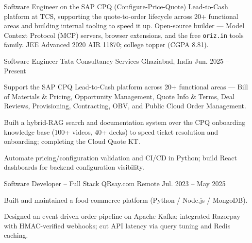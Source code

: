\documentclass[11pt, a4paper]{awesome-cv}
\begin{document}
\makecvheader[C]

\begin{cvparagraph}
Software Engineer on the SAP CPQ (Configure-Price-Quote) Lead-to-Cash platform at TCS, supporting the quote-to-order lifecycle across 20+ functional areas and building internal tooling to speed it up. Open-source builder — Model Context Protocol (MCP) servers, browser extensions, and the free \texttt{oriz.in} tools family. JEE Advanced 2020 AIR 11870; college topper (CGPA 8.81).
\end{cvparagraph}


\begin{cventries}

  \cventry
    {Software Engineer}
    {Tata Consultancy Services}
    {Ghaziabad, India}
    {Jun. 2025 -- Present}
    {
      \begin{cvitems}
        \item Support the SAP CPQ Lead-to-Cash platform across 20+ functional areas — Bill of Materials \& Pricing, Opportunity Management, Quote Info \& Terms, Deal Reviews, Provisioning, Contracting, OBV, and Public Cloud Order Management.
        \item Built a hybrid-RAG search and documentation system over the CPQ onboarding knowledge base (100+ videos, 40+ decks) to speed ticket resolution and onboarding; completing the Cloud Quote KT.
        \item Automate pricing/configuration validation and CI/CD in Python; build React dashboards for backend configuration visibility.
      \end{cvitems}
    }

  \cventry
    {Software Developer -- Full Stack}
    {QRsay.com}
    {Remote}
    {Jul. 2023 -- May 2025}
    {
      \begin{cvitems}
        \item Built and maintained a food-commerce platform (Python / Node.js / MongoDB).
        \item Designed an event-driven order pipeline on Apache Kafka; integrated Razorpay with HMAC-verified webhooks; cut API latency via query tuning and Redis caching.
      \end{cvitems}
    }

\end{cventries}
\end{document}
